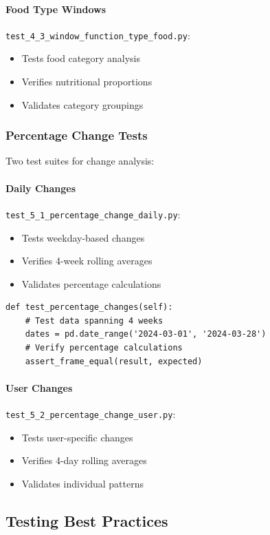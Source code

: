 \paragraph{Food Type Windows} \texttt{test\_4\_3\_window\_function\_type\_food.py}:
\begin{itemize}
    \item Tests food category analysis
    \item Verifies nutritional proportions
    \item Validates category groupings
\end{itemize}

\subsubsection{Percentage Change Tests}
Two test suites for change analysis:

\paragraph{Daily Changes} \texttt{test\_5\_1\_percentage\_change\_daily.py}:
\begin{itemize}
    \item Tests weekday-based changes
    \item Verifies 4-week rolling averages
    \item Validates percentage calculations
\end{itemize}

\begin{lstlisting}[style=pythonstyle, caption=Percentage Change Test]
def test_percentage_changes(self):
    # Test data spanning 4 weeks
    dates = pd.date_range('2024-03-01', '2024-03-28')
    # Verify percentage calculations
    assert_frame_equal(result, expected)
\end{lstlisting}

\paragraph{User Changes} \texttt{test\_5\_2\_percentage\_change\_user.py}:
\begin{itemize}
    \item Tests user-specific changes
    \item Verifies 4-day rolling averages
    \item Validates individual patterns
\end{itemize}

\subsection{Testing Best Practices}

